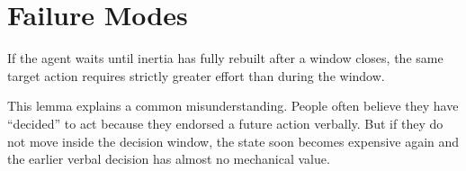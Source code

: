 \section{Failure Modes}

\begin{lemma}
If the agent waits until inertia has fully rebuilt after a window closes, the
same target action requires strictly greater effort than during the window.
\end{lemma}

\begin{discussion}
This lemma explains a common misunderstanding. People often believe they have
``decided'' to act because they endorsed a future action verbally. But if they
do not move inside the decision window, the state soon becomes expensive again
and the earlier verbal decision has almost no mechanical value.
\end{discussion}
